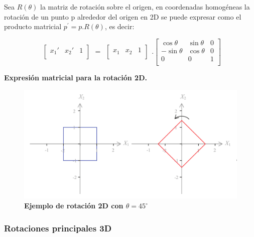 Sea $R(\theta)$ la matriz de rotación sobre el origen, en coordenadas homogéneas la
rotación de un punto p alrededor del origen en 2D se puede expresar como el producto matricial $p^{\prime} = p.R(\theta)$, es decir:

\begin{equation}
\begin{array}{rccl}
\left[
\begin{array}{rccl}
x_{1}{\prime} & x_{2}{\prime} & 1\\
\end{array}
\right]
\end{array}
=
\begin{array}{rccl}
\left[
\begin{array}{rccl}
x_{1} & x_{2} &  1\\
\end{array}
\right]
\end{array} 
.
\left[
\begin{array}{rccl}
\cos\theta & \sin\theta & 0\\
-\sin\theta & \cos\theta & 0\\
0 & 0 & 1\\
\end{array}
\right]
\end{equation}

\begin{center}
\textbf{\footnotesize{Expresión matricial para la rotación 2D.}}
\end{center}


\begin{figure}[h]
\includegraphics[width=12cm]{Img/GEO/geo-rotacion2d45.jpg}
\centering
    \caption{\footnotesize{\textbf{Ejemplo de rotación 2D con $\theta = 45^{\circ}$}}}
\end{figure}


\clearpage
\subsubsection{Rotaciones principales 3D}

